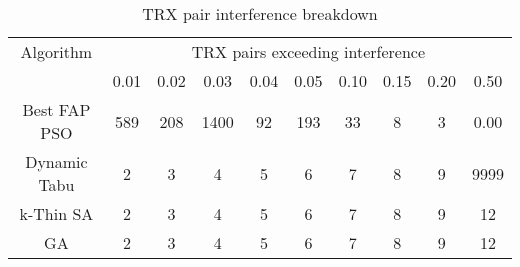 \begin{table}[H]
\centering
	\begin{tabular}{cccccccccc}
	\toprule
    Algorithm & \multicolumn{9}{c}{TRX pairs exceeding interference}\\
    & 0.01 & 0.02 & 0.03 & 0.04 & 0.05 & 0.10 & 0.15 & 0.20 & 0.50 \\
    \midrule
    Best FAP PSO & 589 & 208 & 1400 & 92 & 193 & 33 & 8 & 3 & 0.00\\
    Dynamic Tabu & 2 & 3 & 4 & 5 & 6 & 7 & 8 & 9 & 9999\\
    k-Thin SA & 2 & 3 & 4 & 5 & 6 & 7 & 8 & 9 & 12\\
    GA & 2 & 3 & 4 & 5 & 6 & 7 & 8 & 9 & 12\\
    \bottomrule
	\end{tabular}
\caption{TRX pair interference breakdown}
\label{tab:breakdown-siem2m1}
\end{table}

